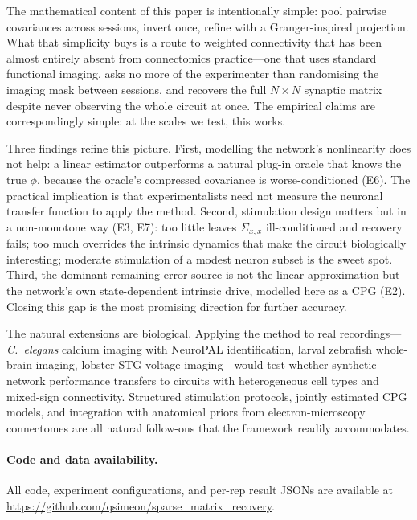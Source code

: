 \documentclass{article}
\begin{document}
The mathematical content of this paper is intentionally simple: pool pairwise covariances across sessions, invert once, refine with a Granger-inspired projection.
What that simplicity buys is a route to weighted connectivity that has been almost entirely absent from connectomics practice---one that uses standard functional imaging, asks no more of the experimenter than randomising the imaging mask between sessions, and recovers the full $N{\times}N$ synaptic matrix despite never observing the whole circuit at once.
The empirical claims are correspondingly simple: at the scales we test, this works.

Three findings refine this picture.
First, modelling the network's nonlinearity does not help: a linear estimator outperforms a natural plug-in oracle that knows the true $\phi$, because the oracle's compressed covariance is worse-conditioned (E6).
The practical implication is that experimentalists need not measure the neuronal transfer function to apply the method.
Second, stimulation design matters but in a non-monotone way (E3, E7): too little leaves $\Sigma_{x,x}$ ill-conditioned and recovery fails; too much overrides the intrinsic dynamics that make the circuit biologically interesting; moderate stimulation of a modest neuron subset is the sweet spot.
Third, the dominant remaining error source is not the linear approximation but the network's own state-dependent intrinsic drive, modelled here as a CPG (E2). Closing this gap is the most promising direction for further accuracy.

The natural extensions are biological.
Applying the method to real recordings---\textit{C.~elegans} calcium imaging with NeuroPAL identification, larval zebrafish whole-brain imaging, lobster STG voltage imaging---would test whether synthetic-network performance transfers to circuits with heterogeneous cell types and mixed-sign connectivity.
Structured stimulation protocols, jointly estimated CPG models, and integration with anatomical priors from electron-microscopy connectomes are all natural follow-ons that the framework readily accommodates.


\paragraph{Code and data availability.}
All code, experiment configurations, and per-rep result JSONs are available at \url{https://github.com/qsimeon/sparse_matrix_recovery}.
\end{document}
